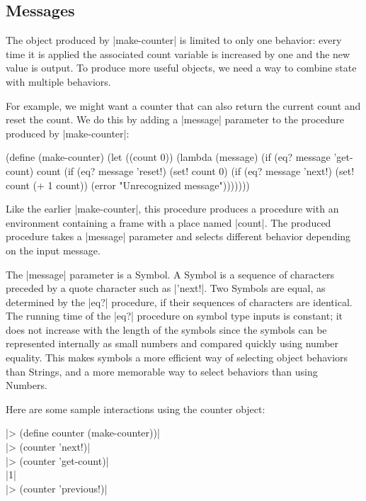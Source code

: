 \begin{schemeregion}
\subsection{Messages}\label{sec:messages}

The object produced by \scheme|make-counter| is limited to only one behavior: every time it is applied the associated count variable is increased by one and the new value is output.  To produce more useful objects, we need a way to combine state with multiple behaviors.  

For example, we might want a counter that can also return the current count and reset the count.  We do this by adding a \scheme|message| parameter to the procedure produced by \scheme|make-counter|:

\begin{schemedisplay}
(define (make-counter)
  (let ((count 0))
    (lambda (message)
      (if (eq? message 'get-count) count
          (if (eq? message 'reset!) (set! count 0)
              (if (eq? message 'next!) (set! count (+ 1 count))              
                  (error "Unrecognized message")))))))
\end{schemedisplay}

Like the earlier \scheme|make-counter|, this procedure produces a procedure with an environment containing a frame with a place named \scheme|count|.  The produced procedure takes a \scheme|message| parameter and selects different behavior depending on the input message.  

The \scheme|message| parameter is a Symbol.  A Symbol is a sequence of characters preceded by a quote character such as \scheme|'next!|.  Two Symbols are equal, as determined by the \scheme|eq?| procedure, if their sequences of characters are identical.  The running time of the \scheme|eq?| procedure on symbol type inputs is constant; it does not increase with the length of the symbols since the symbols can be represented internally as small numbers and compared quickly using number equality.  This makes symbols a more efficient way of selecting object behaviors than Strings, and a more memorable way to select behaviors than using Numbers.

Here are some sample interactions using the counter object:
\begin{code}
\scheme|> (define counter (make-counter))|\\
\scheme|> (counter 'next!)|\\
\scheme|> (counter 'get-count)|\\
\schemeresult|1|\\
\scheme|> (counter 'previous!)|\\
\end{code}


\end{schemeregion}
